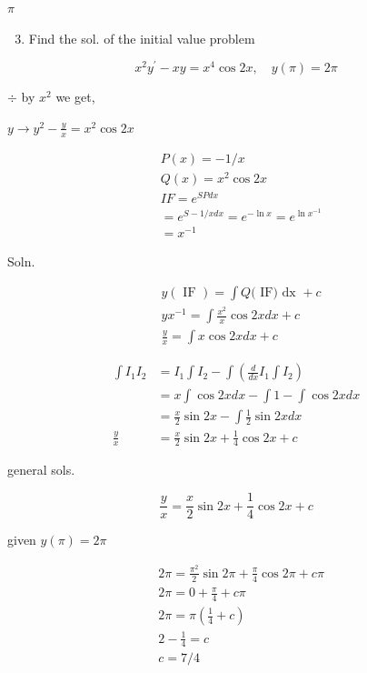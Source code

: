 \documentclass[10pt]{article}
\begin{document}
$\pi$

\begin{enumerate}
  \setcounter{enumi}{2}
  \item Find the sol. of the initial value problem
\end{enumerate}

$$
x^{2} y^{\prime}-x y=x^{4} \cos 2 x, \quad y(\pi)=2 \pi
$$

$\div$ by $x^{2}$ we get,

$y \rightarrow y^{2}-\frac{y}{x}=x^{2} \cos 2 x$

$$
\begin{aligned}
& P(x)=-1 / x \\
& Q(x)=x^{2} \cos 2 x \\
& I F=e^{S P d x} \\
& =e^{S-1 / x d x}=e^{-\ln x}=e^{\ln x^{-1}} \\
& =x^{-1}
\end{aligned}
$$

Soln.


\begin{align*}
& y(\text { IF })=\int Q(\text { IF) dx }+c \\
& y x^{-1}=\int \frac{x^{2}}{x} \cos 2 x d x+c \\
& \frac{y}{x}=\int x \cos 2 x d x+c \tag{1}
\end{align*}


$$
\begin{aligned}
\int I_{1} I_{2} & =I_{1} \int I_{2}-\int\left(\frac{d}{d x} I_{1} \int I_{2}\right) \\
& =x \int \cos 2 x d x-\int 1-\int \cos 2 x d x \\
& =\frac{x}{2} \sin 2 x-\int \frac{1}{2} \sin 2 x d x \\
\frac{y}{x} & =\frac{x}{2} \sin 2 x+\frac{1}{4} \cos 2 x+c
\end{aligned}
$$

general sols.

$$
\frac{y}{x}=\frac{x}{2} \sin 2 x+\frac{1}{4} \cos 2 x+c
$$

given $y(\pi)=2 \pi$

$$
\begin{aligned}
& 2 \pi=\frac{\pi^{2}}{2} \sin 2 \pi+\frac{\pi}{4} \cos 2 \pi+c \pi \\
& 2 \pi=0+\frac{\pi}{4}+c \pi \\
& 2 \pi=\pi\left(\frac{1}{4}+c\right) \\
& 2-\frac{1}{4}=c \\
& c=7 / 4
\end{aligned}
$$
\end{document}
